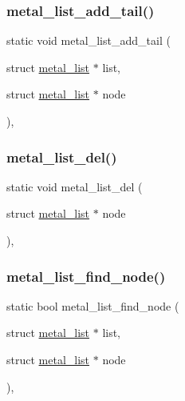 \subsubsection{\texorpdfstring{metal\+\_\+list\+\_\+add\+\_\+tail()}{metal\_list\_add\_tail()}}
{\footnotesize\ttfamily static void metal\+\_\+list\+\_\+add\+\_\+tail (\begin{DoxyParamCaption}\item[{struct \hyperlink{structmetal__list}{metal\+\_\+list} $\ast$}]{list,  }\item[{struct \hyperlink{structmetal__list}{metal\+\_\+list} $\ast$}]{node }\end{DoxyParamCaption})\hspace{0.3cm}{\ttfamily [inline]}, {\ttfamily [static]}}

\mbox{\label{group__list_ga8984cf0b813ddb9ade85f4498435a2b3}} 
\subsubsection{\texorpdfstring{metal\+\_\+list\+\_\+del()}{metal\_list\_del()}}
{\footnotesize\ttfamily static void metal\+\_\+list\+\_\+del (\begin{DoxyParamCaption}\item[{struct \hyperlink{structmetal__list}{metal\+\_\+list} $\ast$}]{node }\end{DoxyParamCaption})\hspace{0.3cm}{\ttfamily [inline]}, {\ttfamily [static]}}

\mbox{\label{group__list_gaffc577ede59f4ef9a539465e5d12a686}} 
\subsubsection{\texorpdfstring{metal\+\_\+list\+\_\+find\+\_\+node()}{metal\_list\_find\_node()}}
{\footnotesize\ttfamily static bool metal\+\_\+list\+\_\+find\+\_\+node (\begin{DoxyParamCaption}\item[{struct \hyperlink{structmetal__list}{metal\+\_\+list} $\ast$}]{list,  }\item[{struct \hyperlink{structmetal__list}{metal\+\_\+list} $\ast$}]{node }\end{DoxyParamCaption})\hspace{0.3cm}{\ttfamily [inline]}, {\ttfamily [static]}}

